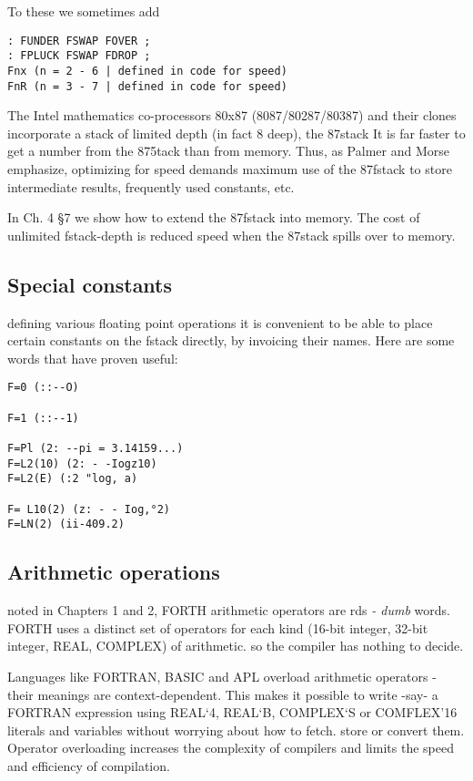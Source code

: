 To these we sometimes add

\begin{verbatim}
: FUNDER FSWAP FOVER ;
: FPLUCK FSWAP FDROP ;
Fnx (n = 2 - 6 | defined in code for speed)
FnR (n = 3 - 7 | defined in code for speed)
\end{verbatim}

The Intel mathematics co-processors 80x87 (8087/80287/80387)
and their clones incorporate a stack of limited depth (in fact 8
deep), the 87stack It is far faster to get a number from the 875tack
than from memory. Thus, as Palmer and Morse emphasize,
optimizing for speed demands maximum use of the 87fstack to store intermediate
results, frequently used constants, etc.

In Ch. 4 §7 we show how to extend the 87fstack into memory. The
cost of unlimited fstack-depth is reduced speed when the 87stack
spills over to memory.

\subsection{Special constants}
defining various floating point operations it is convenient to be
able to place certain constants on the fstack directly, by invoicing
their names. Here are some words that have proven useful:
\begin{verbatim}
F=0 (::--O)

F=1 (::--1)

F=Pl (2: --pi = 3.14159...)
F=L2(10) (2: - -Iogz10)
F=L2(E) (:2 "log, a)

F= L10(2) (z: - - Iog,°2)
F=LN(2) (ii-409.2)
\end{verbatim}
 
\subsection{Arithmetic operations}
noted in Chapters 1 and 2, FORTH arithmetic operators are
rds \textit{- dumb} words. FORTH uses a distinct set of operators
for each kind (16-bit integer, 32-bit integer, REAL, COMPLEX)
of arithmetic. so the compiler has nothing to decide.

Languages like FORTRAN, BASIC and APL overload arithmetic operators - their
meanings are context-dependent. This
makes it possible to write -say- a FORTRAN expression using
REAL‘4, REAL‘B, COMPLEX‘S or COMFLEX’16 literals
and variables without worrying about how to fetch. store or
convert them. Operator overloading increases the complexity of
compilers and limits the speed and efficiency of compilation.

